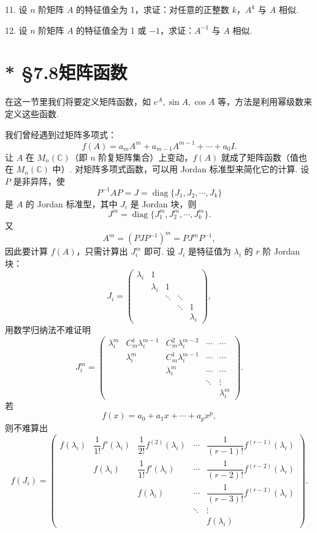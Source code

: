 \documentclass[UTF8,12pt,a4paper,fontset=fandol]{ctexart}
\begin{document}
11. 设 $n$ 阶矩阵 $A$ 的特征值全为 1，求证：对任意的正整数 $k$，$A^k$ 与 $A$ 相似.

12. 设 $n$ 阶矩阵 $A$ 的特征值全为 1 或 $-1$，求证：$A^{-1}$ 与 $A$ 相似.

\section*{* §7.8\quad 矩阵函数}

在这一节里我们将要定义矩阵函数，如 $e^A,\sin A,\cos A$ 等，方法是利用幂级数来定义这些函数.

我们曾经遇到过矩阵多项式：
\[
f(A)=a_mA^m+a_{m-1}A^{m-1}+\cdots+a_0I.
\]
让 $A$ 在 $M_n(\mathbb C)$（即 $n$ 阶复矩阵集合）上变动，$f(A)$ 就成了矩阵函数（值也在 $M_n(\mathbb C)$ 中）. 对矩阵多项式函数，可以用 Jordan 标准型来简化它的计算. 设 $P$ 是非异阵，使
\[
P^{-1}AP=J=\operatorname{diag}\{J_1,J_2,\cdots,J_k\}
\]
是 $A$ 的 Jordan 标准型，其中 $J_i$ 是 Jordan 块，则
\[
J^m=\operatorname{diag}\{J_1^m,J_2^m,\cdots,J_k^m\}.
\]
又
\[
A^m=(PJP^{-1})^m=PJ^mP^{-1},
\]
因此要计算 $f(A)$，只需计算出 $J_i^m$ 即可. 设 $J_i$ 是特征值为 $\lambda_i$ 的 $r$ 阶 Jordan 块：
\[
J_i=\left(\begin{array}{ccccc}
\lambda_i & 1 & & & \\
& \lambda_i & 1 & & \\
& & \ddots & \ddots & \\
& & & \ddots & 1\\
& & & & \lambda_i
\end{array}\right),
\]
用数学归纳法不难证明
\begin{equation}
J_i^m=\left(\begin{array}{ccccc}
\lambda_i^m & C_m^1\lambda_i^{m-1} & C_m^2\lambda_i^{m-2} & \cdots & \cdots\\
& \lambda_i^m & C_m^1\lambda_i^{m-1} & \cdots & \cdots\\
& & \lambda_i^m & \cdots & \cdots\\
& & & \ddots & \vdots\\
& & & & \lambda_i^m
\end{array}\right).
\tag{7.8.1}
\end{equation}
若
\[
f(x)=a_0+a_1x+\cdots+a_px^p,
\]
则不难算出
\begin{equation}
f(J_i)=\left(\begin{array}{ccccc}
f(\lambda_i) & \dfrac1{1!}f'(\lambda_i) & \dfrac1{2!}f^{(2)}(\lambda_i) & \cdots & \dfrac1{(r-1)!}f^{(r-1)}(\lambda_i)\\
& f(\lambda_i) & \dfrac1{1!}f'(\lambda_i) & \cdots & \dfrac1{(r-2)!}f^{(r-2)}(\lambda_i)\\
& & f(\lambda_i) & \cdots & \dfrac1{(r-3)!}f^{(r-3)}(\lambda_i)\\
& & & \ddots & \vdots\\
& & & & f(\lambda_i)
\end{array}\right).
\tag{7.8.2}
\end{equation}
\end{document}
